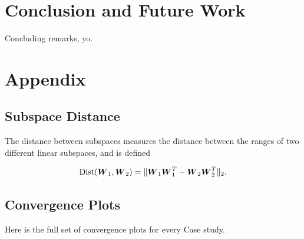 \documentclass[]{aiaa-tc}%
\begin{document}
\section{Conclusion and Future Work} \label{sec:conclusion}

Concluding remarks, yo.





\section{Appendix} \label{sec:appendix}
\subsection{Subspace Distance}
The distance between subspaces measures the distance between the ranges of two different linear subspaces, and is defined\cite{constantine2015}

\begin{equation}
\label{eq:subspace_distance}
\text{Dist}(\boldsymbol{W}_1,\boldsymbol{W}_2) = \|\boldsymbol{W}_1\boldsymbol{W}_1^T - \boldsymbol{W}_2\boldsymbol{W}_2^T\|_2.
\end{equation}

\subsection{Convergence Plots}
Here is the full set of convergence plots for every Case study.
\end{document}
